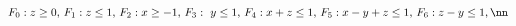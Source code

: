 \begin{equation} 
F_0:z\ge 0, \, F_1:z\le 1, \, F_2:x\ge -1, \, F_3:\
y\le 1, \, F_4:x+z\le 1, \, F_5:x-y+z\le 1, \, F_6:z-y\le 1, 
\nn\end{equation}

